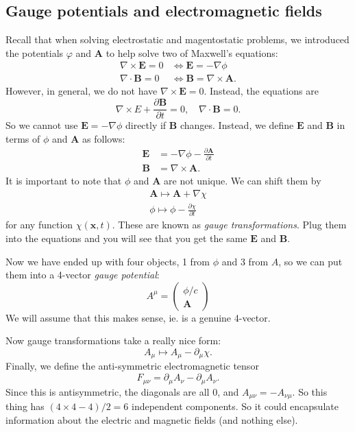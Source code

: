 \documentclass[a4paper]{article}
\begin{document}
\subsection{Gauge potentials and electromagnetic fields}
Recall that when solving electrostatic and magentostatic problems, we introduced the potentials $\varphi$ and $\mathbf{A}$ to help solve two of Maxwell's equations:
\begin{align*}
  \nabla\times \mathbf{E} = 0 &\Leftrightarrow \mathbf{E} = -\nabla \phi\\
  \nabla\cdot \mathbf{B} = 0 &\Leftrightarrow \mathbf{B} = \nabla\times \mathbf{A}.
\end{align*}
However, in general, we do not have $\nabla \times \mathbf{E} = 0$. Instead, the equations are
\[
  \nabla\times E + \frac{\partial \mathbf{B}}{\partial t} = 0,\quad \nabla\cdot \mathbf{B} = 0.
\]
So we cannot use $\mathbf{E} = -\nabla \phi$ directly if $\mathbf{B}$ changes. Instead, we define $\mathbf{E}$ and $\mathbf{B}$ in terms of $\phi$ and $\mathbf{A}$ as follows:
\begin{align*}
  \mathbf{E} &= -\nabla\phi - \frac{\partial \mathbf{A}}{\partial t}\\
  \mathbf{B} &= \nabla\times \mathbf{A}.
\end{align*}
It is important to note that $\phi$ and $\mathbf{A}$ are not unique. We can shift them by
\begin{align*}
  \mathbf{A} \mapsto \mathbf{A} + \nabla \chi\\
  \phi \mapsto \phi - \frac{\partial \chi}{\partial t}
\end{align*}
for any function $\chi(\mathbf{x}, t)$. These are known as \emph{gauge transformations}. Plug them into the equations and you will see that you get the same $\mathbf{E}$ and $\mathbf{B}$.

Now we have ended up with four objects, 1 from $\phi$ and 3 from $A$, so we can put them into a 4-vector \emph{gauge potential}:
\[
  A^\mu =
  \begin{pmatrix}
    \phi/c\\
    \mathbf{A}
  \end{pmatrix}\]
We will assume that this makes sense, ie. is a genuine 4-vector.

Now gauge transformations take a really nice form:
\[
  A_\mu \mapsto A_\mu - \partial_\mu\chi.
\]
Finally, we define the anti-symmetric electromagnetic tensor
\[
  F_{\mu\nu} = \partial_\mu A_\nu -\partial_\mu A_\nu.
\]
Since this is antisymmetric, the diagonals are all 0, and $A_{\mu\nu} = -A_{\nu\mu}$. So this thing has $(4 \times 4 - 4)/2 = 6$ independent components. So it could encapsulate information about the electric and magnetic fields (and nothing else).
\end{document}
